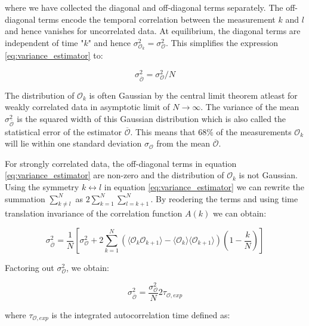 where we have collected the diagonal and off-diagonal terms separately. The
off-diagonal terms encode the temporal correlation between the measurement $k$
and $l$ and hence vanishes for uncorrelated data. At equilibrium, the diagonal
terms are independent of time "$k$" and hence $\sigma^2_{\mathcal{O}_k} =
\sigma^2_{\mathcal{O}}$. This simplifies the expression
\ref{eq:variance_estimator} to:

\begin{equation}
  \label{eq:variance_estimator_uncorrelated}
  \sigma^2_{\overline{\mathcal{O}}} = \sigma^2_{\mathcal{O}}/N
\end{equation}

The distribution of $\mathcal{O}_k$ is often Gaussian by the central limit
theorem atleast for weakly correlated data in asymptotic limit of
$N\rightarrow\infty$. The variance of the mean
$\sigma^2_{\overline{\mathcal{O}}}$ is the squared width of this Gaussian
distribution which is also called the statistical error of the estimator
$\overline{\mathcal{O}}$. This means that $68\%$ of the measurements
$\mathcal{O}_k$ will lie within one standard deviation $\sigma_{\mathcal{O}}$
from the mean $\overline{\mathcal{O}}$. 

For strongly correlated data, the off-diagonal terms in equation
\ref{eq:variance_estimator} are non-zero and the distribution of $\mathcal{O}_k$
is not Gaussian. Using the symmetry $k\leftrightarrow l$ in equation
\ref{eq:variance_estimator} we can rewrite the summation $\sum_{k\neq l}^{N}$ as
$2\sum_{k=1}^{N}\sum_{l=k+1}^{N}$. By reodering the terms and using time
translation invariance of the correlation function $A(k)$ we can obtain:

\begin{equation}
  \sigma^2_{\overline{\mathcal{O}}} = \frac{1}{N}\left[ \sigma^2_{\mathcal{O}} + 2\sum_{k=1}^{N} \left(\langle\mathcal{O}_k\mathcal{O}_{k+1}\rangle - \langle\mathcal{O}_k\rangle\langle\mathcal{O}_{k+1}\rangle\right) \left(1-\frac{k}{N}\right) \right]
\end{equation}

Factoring out $\sigma^2_{\mathcal{O}}$, we obtain:

\begin{equation}
  \label{eq:variance_estimator_correlated}
  \sigma^2_{\overline{\mathcal{O}}} = \frac{\sigma^2_{\mathcal{O}}}{N} 2\tau_{\mathcal{O}, exp}
\end{equation}

where $\tau_{\mathcal{O}, exp}$ is the integrated autocorrelation time defined
as:

